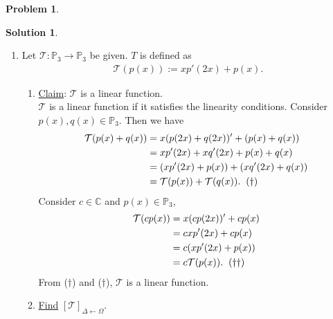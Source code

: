\documentclass{book}
\theoremstyle{definition}
\newtheorem*{prob*}{Problem}
\newtheorem*{sln*}{Solution}
\newcommand{\T}{\mathcal{T}}
\begin{document}
\begin{prob*}
\begin{sln*}
\begin{enumerate}
			
			\item Let $\T : \mathbb{P}_3 \to \mathbb{P}_3$ be given. $T$ is defined as
			\begin{align*}
			\T(p(x)) := xp'(2x) + p(x).
			\end{align*}
			\begin{enumerate}
				\item \underline{Claim}: $\T$ is a linear function.\\
				$\T$ is a linear function if it satisfies the linearity conditions. Consider $p(x), q(x) \in \mathbb{P}_3$. Then we have
				\begin{align*}
				\T(p(x) + q(x)) &= x(p(2x) + q(2x))' + (p(x) + q(x))\\
				&= xp'(2x) + xq'(2x) + p(x) + q(x)\\
				&= (xp'(2x) + p(x))  + (xq'(2x) + q(x))\\ 
				&= \T(p(x)) + \T(q(x)).\hspace{0.2cm}(\dagger)
				\end{align*}
				Consider $c\in \mathbb{C}$ and $p(x)\in \mathbb{P}_3$,
				\begin{align*}
				\T(cp(x)) &= x(cp(2x))' + cp(x)\\
				&= cxp'(2x) + cp(x)\\ &= c(xp'(2x) + p(x))\\ &= c\T(p(x)).\hspace{0.2cm}(\dagger\dagger)
				\end{align*}
				From ($\dagger$) and ($\dagger$), $\T$ is a linear function. \\
				
				
				
				
				\item \underline{Find} $[\T]_{\Delta\leftarrow\Omega}$.\\
				

\end{enumerate}
\end{enumerate}
\end{sln*}
\end{prob*}
\end{document}
